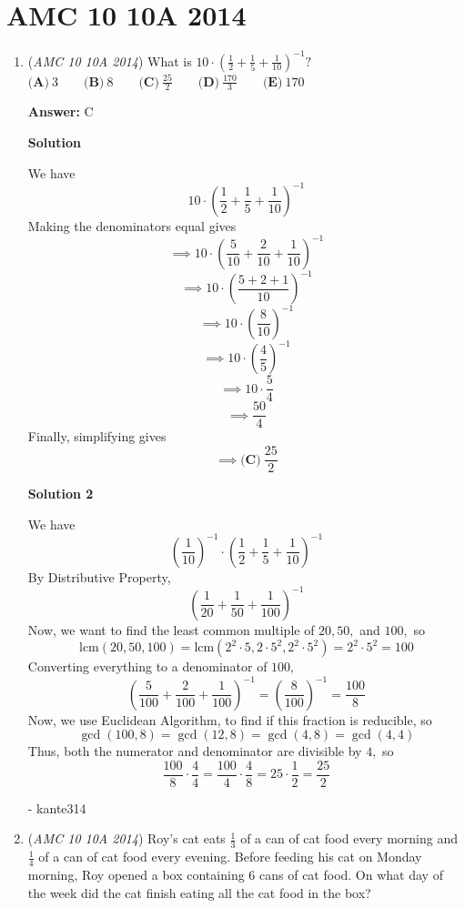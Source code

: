 \section{AMC 10 10A 2014}
        \begin{enumerate}
        	\item (\textit{AMC 10 10A 2014}) What is $10 \cdot \left(\frac{1}{2} + \frac{1}{5} + \frac{1}{10}\right)^{-1}?$
$\textbf{(A)}\ 3\qquad\textbf{(B)}\ 8\qquad\textbf{(C)}\ \frac{25}{2}\qquad\textbf{(D)}\ \frac{170}{3}\qquad\textbf{(E)}\ 170$

 \textbf{Answer: }C



\textbf{Solution}

We have 
 \[10\cdot\left(\frac{1}{2}+\frac{1}{5}+\frac{1}{10}\right)^{-1}\]Making the denominators equal gives
 \[\implies 10\cdot\left(\frac{5}{10}+\frac{2}{10}+\frac{1}{10}\right)^{-1}\]
 \[\implies 10\cdot\left(\frac{5+2+1}{10}\right)^{-1}\]
 \[\implies 10\cdot\left(\frac{8}{10}\right)^{-1}\]
 \[\implies 10\cdot\left(\frac{4}{5}\right)^{-1}\]
 \[\implies 10\cdot\frac{5}{4}\]
 \[\implies \frac{50}{4}\]Finally, simplifying gives
 \[\implies \boxed{\textbf{(C)}\ \frac{25}{2}}\]




\textbf{Solution 2}

We have
 \[\left(\frac{1}{10}\right)^{-1}\cdot \left(\frac{1}{2} + \frac{1}{5} + \frac{1}{10}\right)^{-1}\]By Distributive Property,
 \[\left(\frac{1}{20}+\frac{1}{50}+\frac{1}{100}\right)^{-1}\]Now, we want to find the least common multiple of $20, 50,$ and $100,$ so
 \[\text{lcm}(20,50,100)=\text{lcm}(2^2 \cdot 5,2 \cdot 5^2,2^2 \cdot 5^2)=2^2 \cdot 5^2=100\]Converting everything to a denominator of $100,$
 \[\left(\frac{5}{100}+\frac{2}{100}+\frac{1}{100}\right)^{-1}=\left(\frac{8}{100}\right)^{-1}=\frac{100}{8}\]Now, we use Euclidean Algorithm, to find if this fraction is reducible, so
 \[\gcd(100,8)=\gcd(12,8)=\gcd(4,8)=\gcd(4,4)\]Thus, both the numerator and denominator are divisible by $4,$ so
 \[\frac{100}{8} \cdot \frac{4}{4}=\frac{100}{4} \cdot \frac{4}{8}=25 \cdot \frac{1}{2}=\boxed{\frac{25}{2}}\]

 - kante314

 


 


 


	\item (\textit{AMC 10 10A 2014}) Roy's cat eats $\frac{1}{3}$ of a can of cat food every morning and $\frac{1}{4}$ of a can of cat food every evening. Before feeding his cat on Monday morning, Roy opened a box containing $6$ cans of cat food. On what day of the week did the cat finish eating all the cat food in the box?



\end{enumerate}
